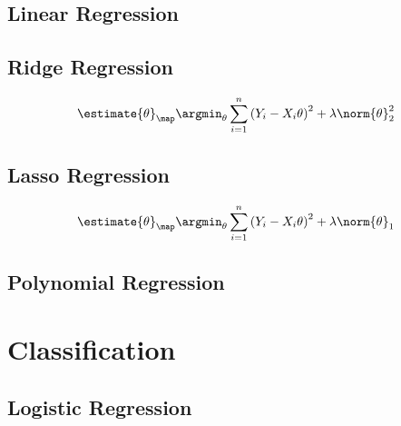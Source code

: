 \documentclass[18pt,a3paper,landscape, ncols=3]{cheatsheet}
\begin{document}
	\subsection{Linear Regression}
		\begin{mdframed}
			\vspace{10mm}
		\end{mdframed}
		\begin{mdframed}
			\vspace{20mm}
		\end{mdframed}
	\subsection{Ridge Regression}
		\begin{mdframed}
			\[
				\estimate{\theta}_{\map}\argmin_{\theta} \sum_{i=1}^{n} {(Y_i - X_i \theta)}^2 + \lambda \norm{\theta}_{2}^{2}
			\]
		\end{mdframed}
		\begin{mdframed}
			\vspace{20mm}
		\end{mdframed}
	\subsection{Lasso Regression}
		\begin{mdframed}
			\[
				\estimate{\theta}_{\map}\argmin_{\theta} \sum_{i=1}^{n} {(Y_i - X_i \theta)}^2 + \lambda \norm{\theta}_{1}
			\]
		\end{mdframed}
		\begin{mdframed}
			\vspace{15mm}
		\end{mdframed}
	\subsection{Polynomial Regression}
		\begin{mdframed}
			\vspace{10mm}
		\end{mdframed}
		\begin{mdframed}
			\vspace{20mm}
		\end{mdframed}

\section{Classification} \seperator
	\subsection{Logistic Regression}
		\begin{mdframed}
			\vspace{10mm}
		\end{mdframed}
		\begin{mdframed}
			\vspace{20mm}
		\end{mdframed}
\end{document}
